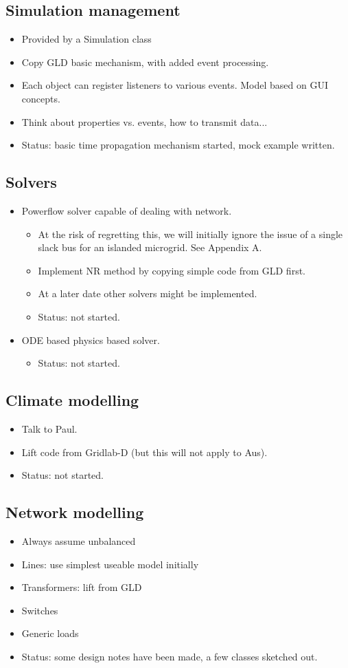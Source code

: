 \documentclass[12pt]{article}
\newcommand{\itm}[1]{\begin{itemize}#1\end{itemize}}
\begin{document}
\subsection{Simulation management}
\itm{
	\item Provided by a Simulation class
	\item Copy GLD basic mechanism, with added event processing.
	\item Each object can register listeners to various events. Model based on GUI concepts.
	\item Think about properties vs. events, how to transmit data...
	\item Status: basic time propagation mechanism started, mock example written.
}

\subsection{Solvers}
\itm{
	\item Powerflow solver capable of dealing with network.
	\itm{
	\item At the risk of regretting this, we will initially ignore the issue of a single slack bus for an islanded microgrid. See Appendix A.
	\item Implement NR method by copying simple code from GLD first.
	\item At a later date other solvers might be implemented.
	\item Status: not started.
}
	\item ODE based physics based solver.
\itm{
	\item Status: not started.
}
}

\subsection{Climate modelling}
\itm{
	\item Talk to Paul.
	\item Lift code from Gridlab-D (but this will not apply to Aus).
	\item Status: not started.
}

\subsection{Network modelling}
\itm{
	\item Always assume unbalanced
	\item Lines: use simplest useable model initially
	\item Transformers: lift from GLD
	\item Switches
	\item Generic loads
	\item Status: some design notes have been made, a few classes sketched out.
}
\end{document}
